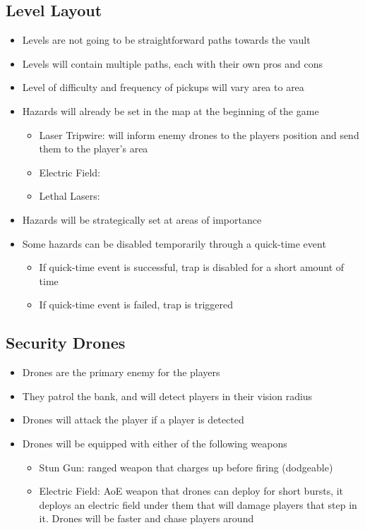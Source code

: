\documentclass[14pts]{report}
\begin{document}
\subsection{Level Layout}
\begin{itemize}
    \item Levels are not going to be straightforward paths towards the vault
    \item Levels will contain multiple paths, each with their own pros and cons
    \item Level of difficulty and frequency of pickups will vary area to area
    \item Hazards will already be set in the map at the beginning of the game
    \begin{itemize}
        \item Laser Tripwire: will inform enemy drones to the players position and send them to the player's area
        \item Electric Field: 
        \item Lethal Lasers: 
    \end{itemize}
    \item Hazards will be strategically set at areas of importance
    \item Some hazards can be disabled temporarily through a quick-time event
    \begin{itemize}
        \item If quick-time event is successful, trap is disabled for a short amount of time
        \item If quick-time event is failed, trap is triggered
    \end{itemize}
\end{itemize}

\subsection{Security Drones}
\begin{itemize}
    \item Drones are the primary enemy for the players
    \item They patrol the bank, and will detect players in their vision radius
    \item Drones will attack the player if a player is detected
    \item Drones will be equipped with either of the following weapons
    \begin{itemize}
        \item Stun Gun: ranged weapon that charges up before firing (dodgeable)
        \item Electric Field: AoE weapon that drones can deploy for short bursts, it deploys an electric field under them that will damage players that step in it. Drones will be faster and chase players around
    \end{itemize}
\end{itemize}
\end{document}
